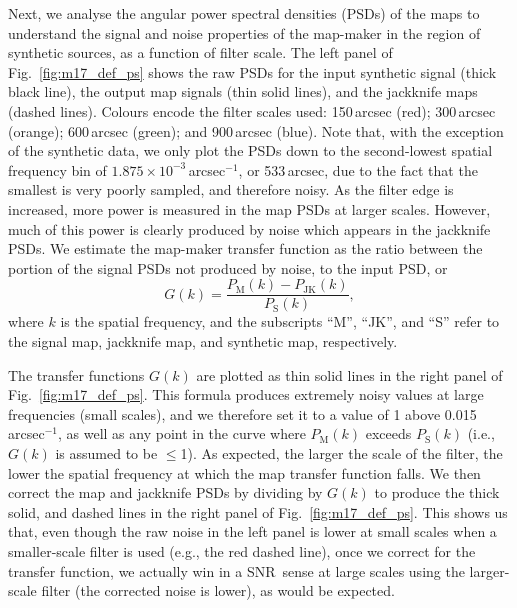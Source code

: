 \documentclass[useAMS,usenatbib,nofootinbib]{mn2e}
\newcommand{\snr}{SNR}
\begin{document}
Next, we analyse the angular power spectral densities (PSDs) of the
maps to understand the signal and noise properties of the map-maker in
the region of synthetic sources, as a function of filter scale. The
left panel of Fig.~\ref{fig:m17_def_ps} shows the raw PSDs for the
input synthetic signal (thick black line), the output map signals
(thin solid lines), and the jackknife maps (dashed lines). Colours
encode the filter scales used: 150\,arcsec (red); 300\,arcsec
(orange); 600\,arcsec (green); and 900\,arcsec (blue). Note that, with
the exception of the synthetic data, we only plot the PSDs down to the
second-lowest spatial frequency bin of
$1.875\times10^{-3}$\,arcsec$^{-1}$, or 533\,arcsec, due to the fact
that the smallest is very poorly sampled, and therefore noisy. As the
filter edge is increased, more power is measured in the map PSDs at
larger scales. However, much of this power is clearly produced by
noise which appears in the jackknife PSDs. We estimate the map-maker
transfer function as the ratio between the portion of the signal PSDs
not produced by noise, to the input PSD, or
%
\begin{equation}
G(k) = \frac{P_\mathrm{M}(k) - P_\mathrm{JK}(k)}{P_\mathrm{S}(k)},
\end{equation}
%
where $k$ is the spatial frequency, and the subscripts ``M'', ``JK'',
and ``S'' refer to the signal map, jackknife map, and synthetic map,
respectively.

The transfer functions $G(k)$ are plotted as thin solid lines in the
right panel of Fig.~\ref{fig:m17_def_ps}. This formula produces
extremely noisy values at large frequencies (small scales), and we
therefore set it to a value of 1 above 0.015\,arcsec$^{-1}$, as well
as any point in the curve where $P_\mathrm{M}(k)$ exceeds
$P_\mathrm{S}(k)$ (i.e., $G(k)$ is assumed to be $\le$1). As expected,
the larger the scale of the filter, the lower the spatial frequency at
which the map transfer function falls. We then correct the map and
jackknife PSDs by dividing by $G(k)$ to produce the thick solid, and
dashed lines in the right panel of Fig.~\ref{fig:m17_def_ps}. This
shows us that, even though the raw noise in the left panel is lower at
small scales when a smaller-scale filter is used (e.g., the red dashed
line), once we correct for the transfer function, we actually win in a
\snr\ sense at large scales using the larger-scale filter (the
corrected noise is lower), as would be expected.
\end{document}
